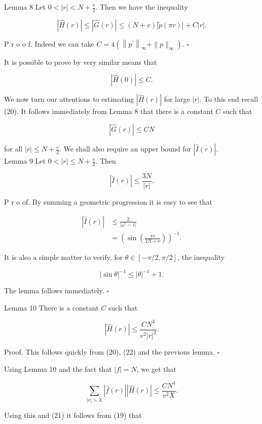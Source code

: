 \documentclass[10pt]{article}
\begin{document}
Lemma 8 Let $0<|r|<N+\frac{v}{2}$. Then we have the inequality

$$
|\hat{H}(r)| \leq|\hat{G}(r)| \leq(N+v)|\tilde{p}(\pi r)|+C|r| .
$$

P r o o f. Indeed we can take $C=4\left(\left\|p^{\prime}\right\|_{\infty}+\|p\|_{\infty}\right)$. \(\square\)

It is possible to prove by very similar means that


\begin{equation*}
|\hat{H}(0)| \leq C . \tag{21}
\end{equation*}


We now turn our attentions to estimating $|\hat{H}(r)|$ for large $|r|$. To this end recall (20). It follows immediately from Lemma 8 that there is a constant $C$ such that


\begin{equation*}
|\hat{G}(r)| \leq C N \tag{22}
\end{equation*}


for all $|r| \leq N+\frac{v}{2}$. We shall also require an upper bound for $|\hat{I}(r)|$.\\
Lemma 9 Let $0<|r| \leq N+\frac{v}{2}$. Then

$$
|\hat{I}(r)| \leq \frac{3 N}{|r|} .
$$

P r o of. By summing a geometric progression it is easy to see that

$$
\begin{aligned}
|\hat{I}(r)| & \leq \frac{2}{\left|\omega^{r}-1\right|} \\
& =\left(\sin \left(\frac{\pi r}{2 N+v}\right)\right)^{-1} .
\end{aligned}
$$

It is also a simple matter to verify, for $\theta \in[-\pi / 2, \pi / 2]$, the inequality

$$
|\sin \theta|^{-1} \leq|\theta|^{-1}+1 .
$$

The lemma follows immediately. \(\square\)

Lemma 10 There is a constant $C$ such that

$$
|\hat{H}(r)| \leq \frac{C N^{3}}{v^{2}|r|^{2}} .
$$

Proof. This follows quickly from (20), (22) and the previous lemma. \(\square\)

Using Lemma 10 and the fact that $|f|=N$, we get that

$$
\sum_{|r|>X}|\hat{f}(r)||\hat{H}(r)| \leq \frac{C N^{4}}{v^{2} X} .
$$

Using this and (21) it follows from (19) that
\end{document}
